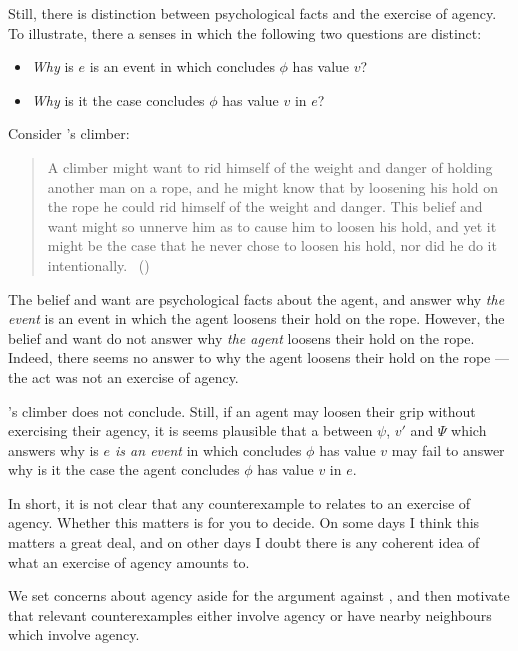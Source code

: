 \begin{note}
  Still, there is distinction between psychological facts and the exercise of agency.
  To illustrate, there a senses in which the following two questions are distinct:

  \begin{itemize}
  \item
    \emph{Why} is \(e\) is an event in which \vAgent{} concludes \(\phi\) has value \(v\)?
  \item
    \emph{Why} is it the case \vAgent{} concludes \(\phi\) has value \(v\) in \(e\)?
  \end{itemize}

  Consider \citeauthor{Davidson:1973vd}'s climber:

  \begin{quote}
    A climber might want to rid himself of the weight and danger of holding another man on a rope, and he might know that by loosening his hold on the rope he could rid himself of the weight and danger.
    This belief and want might so unnerve him as to cause him to loosen his hold, and yet it might be the case that he never chose to loosen his hold, nor did he do it intentionally.%
    \mbox{ }\hfill\mbox{(\citeauthor[79]{Davidson:1973vd})}
  \end{quote}

  The \agents{} belief and want are psychological facts about the agent, and answer why \emph{the event} is an event in which the agent loosens their hold on the rope.
  However, the \agents{} belief and want do not answer why \emph{the agent} loosens their hold on the rope.
  Indeed, there seems no answer to why the agent loosens their hold on the rope --- the act was not an exercise of agency.

  \citeauthor{Davidson:1973vd}'s climber does not conclude.
  Still, if an agent may loosen their grip without exercising their agency, it is seems plausible that a \ros{} between \(\psi\), \(v'\) and \(\Psi\) which answers why is \emph{\(e\) is an event} in which \vAgent{} concludes \(\phi\) has value \(v\) may fail to answer why is it the case the agent concludes \(\phi\) has value \(v\) in \(e\).

  In short, it is not clear that any counterexample to \issueInclusion{} relates to an exercise of agency.
  Whether this matters is for you to decide.
  On some days I think this matters a great deal, and on other days I doubt there is any coherent idea of what an exercise of agency amounts to.

  We set concerns about agency aside for the argument against \issueInclusion{}, and then motivate that relevant counterexamples either involve agency or have nearby neighbours which involve agency.
\end{note}

